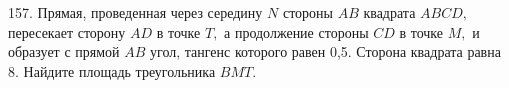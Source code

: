 157. Прямая, проведенная через середину $N$ стороны $AB$ квадрата $ABCD,$ пересекает сторону $AD$ в точке
$T,$ а продолжение стороны $CD$ в точке $M,$ и образует с прямой $AB$ угол, тангенс которого равен 0,5.
Сторона квадрата равна 8. Найдите площадь треугольника $BMT.$\\
